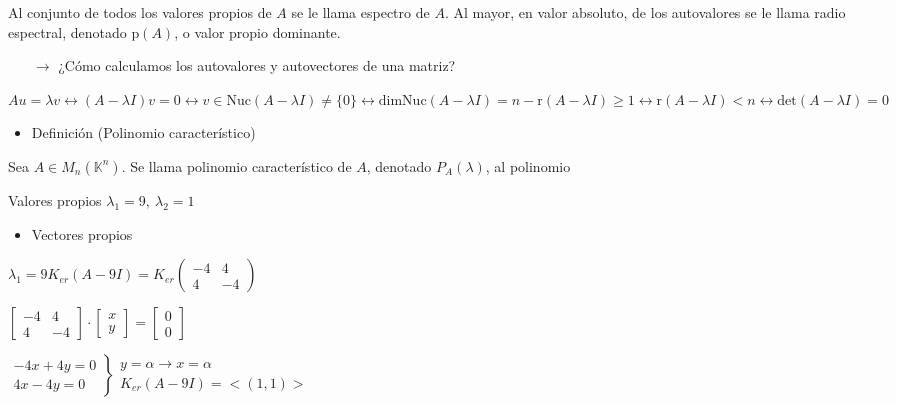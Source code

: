 \documentclass[12pt]{article}
\begin{document}
Al conjunto de todos los valores propios de $A$ se le llama espectro de $A$. Al mayor, en valor absoluto, de los autovalores se le llama radio espectral, denotado $\mathrm{p}(A)$, o valor propio dominante.
\begin{itemize}
\item[$\longrightarrow$] ¿Cómo calculamos los autovalores y autovectores de una matriz? 
\end{itemize}
$Au=\lambda v\longleftrightarrow(A-\lambda I)v=0\longleftrightarrow v\in\mathrm{Nuc}(A-\lambda I)\neq\{0\}\longleftrightarrow\mathrm{dimNuc}(A-\lambda I)=n-\mathrm{r}(A-\lambda I)\ge1\longleftrightarrow\mathrm{r}(A-\lambda I)< n\longleftrightarrow\mathrm{det}(A-\lambda I)=0$
\begin{itemize}[label=\color{red}\textbullet, leftmargin=*]
    \item \color{lightblue} Definición (Polinomio característico)
\end{itemize}
Sea $A\in M_n(\mathbb{K}^n)$. Se llama polinomio característico de $A$, denotado $P_A(\lambda)$, al polinomio \begin{center}
\end{center}
Valores propios $\lambda_1=9,~\lambda_2=1$
\begin{itemize}[label=\color{red}\textbullet, leftmargin=*]
    \item \color{lightblue} Vectores propios
\end{itemize}
$\lambda_1=9$\hspace{1cm}$K_{er}(A-9I)=K_{er}\begin{pmatrix}
-4 & 4 \\ 
4 & -4
\end{pmatrix} $

$\begin{bmatrix}
-4 & 4 \\ 
4 & -4
\end{bmatrix}\cdot\begin{bmatrix}
x\\
y
\end{bmatrix}=\begin{bmatrix}
0\\
0
\end{bmatrix} $

$\left.\begin{array}{r}
-4x+4y=0\\
4x-4y=0
\end{array}\right\rbrace\begin{array}{l}
y=\alpha\longrightarrow x=\alpha\\
K_{er}(A-9I)=<(1,1)>
\end{array}$
\end{document}
